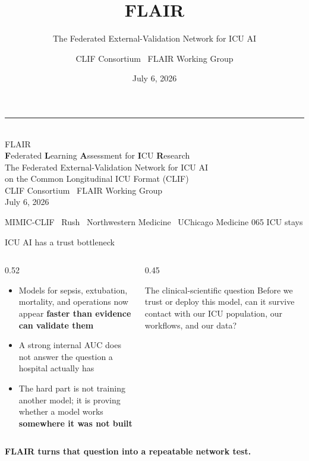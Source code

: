 \documentclass[aspectratio=169,11pt,xcolor={table}]{beamer}
\title{\textbf{FLAIR}}
\subtitle{The Federated External-Validation Network for ICU AI}
\author{CLIF Consortium \textperiodcentered\ FLAIR Working Group}
\date{July 6, 2026}
\newcommand{\emphc}[1]{{\color{flairblue}\textbf{#1}}}
\newcommand{\bigclaim}[1]{\begin{center}{\Large\color{flairink}\textbf{#1}}\end{center}}
\begin{document}
\begin{frame}[plain]
  \vfill
  {\color{flairblue}\rule{0.16\paperwidth}{4pt}}\\[1.1em]
  {\Huge\color{flairink} FLAIR}\\[0.35em]
  {\large\color{flairblue}\textbf{F}ederated \textbf{L}earning \textbf{A}ssessment for \textbf{I}CU \textbf{R}esearch}\\[0.8em]
  {\Large\color{flairink} The Federated External-Validation Network for ICU AI}\\[0.2em]
  {\Large\color{flairmuted} on the Common Longitudinal ICU Format (CLIF)}\\[1.4em]
  {\color{flairmuted} CLIF Consortium \textperiodcentered\ FLAIR Working Group}\\[0.3em]
  {\small\color{flairmuted} July 6, 2026}
  \vfill
  \begin{flushright}\scriptsize\color{flairmuted}
    MIMIC-CLIF \textperiodcentered\ Rush \textperiodcentered\ Northwestern Medicine \textperiodcentered\ UChicago Medicine
    \quad\textbullet{}065 ICU stays
  \end{flushright}
\end{frame}

\begin{frame}{ICU AI has a trust bottleneck}
  \begin{columns}[T]
  \begin{column}{0.52\textwidth}
    \begin{itemize}
      \item Models for sepsis, extubation, mortality, and operations now appear \emphc{faster than evidence can validate them}
      \item A strong internal AUC does not answer the question a hospital actually has
      \item The hard part is not training another model; it is proving whether a model works \emphc{somewhere it was not built}
    \end{itemize}
  \end{column}
  \begin{column}{0.45\textwidth}
    \begin{block}{The clinical-scientific question}
      Before we trust or deploy this model, can it survive contact with our ICU population, our workflows, and our data?
    \end{block}
  \end{column}
  \end{columns}
  \vfill
  \bigclaim{FLAIR turns that question into a repeatable network test.}
\end{frame}
\end{document}

